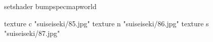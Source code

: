 setshader bumpspecmapworld

    texture c "suiseiseki/85.jpg"
    texture n "suiseiseki/86.jpg"
    texture s "suiseiseki/87.jpg"
